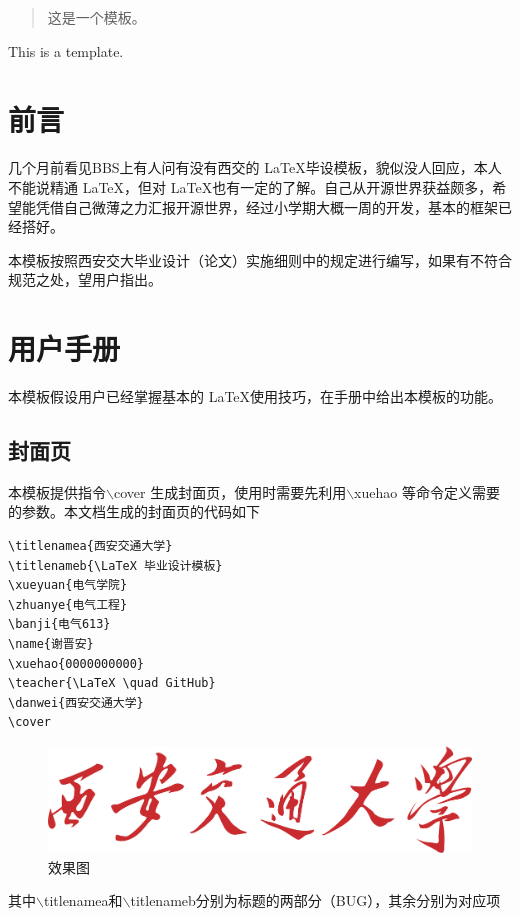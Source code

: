 \documentclass[bachelor]{XJTUthesis}
\begin{document}
\cover


\tableofcontents
\thispagestyle{empty}
\setcounter{page}{0}
\newpage

\begin{abstract}
这是一\cite{陈天宁2004对高校分配制度改革的探索与思考}个模板。
\end{abstract}
\newpage
\begin{eabstract}
This is a template.
\end{eabstract}

\chapter{前言}
几个月前看见BBS上有人问有没有西交的 \LaTeX 毕设模板，貌似没人回应，本人不能说精通 \LaTeX ，但对 \LaTeX 也有一定的了解。自己从开源世界获益颇多，希望能凭借自己微薄之力汇报开源世界，经过小学期大概一周的开发，基本的框架已经搭好。\par
本模板按照西安交大毕业设计（论文）实施细则中的规定进行编写，如果有不符合规范之处，望用户指出。

\chapter{用户手册}
本模板假设用户已经掌握基本的 \LaTeX 使用技巧，在手册中给出本模板的功能。
\section{封面页}
本模板提供指令$\backslash$cover 生成封面页，使用时需要先利用$\backslash$xuehao 等命令定义需要的参数。本文档生成的封面页的代码如下
\begin{lstlisting}
\titlenamea{西安交通大学}
\titlenameb{\LaTeX 毕业设计模板}
\xueyuan{电气学院}
\zhuanye{电气工程}
\banji{电气613}
\name{谢晋安}
\xuehao{0000000000}
\teacher{\LaTeX \quad GitHub}
\danwei{西安交通大学}
\cover
\end{lstlisting}

\begin{figure}[htbp]
  \centering
  \includegraphics[width=1\textwidth]{figures//a2_1zwxm.png}
  \caption{效果图}
\end{figure}
其中$\backslash$titlenamea和$\backslash$titlenameb分别为标题的两部分（BUG），其余分别为对应项
\end{document}

